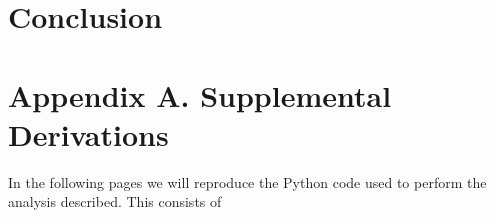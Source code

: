 \documentclass{amsart}
\theoremstyle{plain}
\numberwithin{equation}{section}
\begin{document}
\section{Conclusion}

\newpage




\newpage

\section*{Appendix A. Supplemental Derivations}
%

In the following pages we will reproduce the Python code used to perform the
analysis described. This consists of
\end{document}
